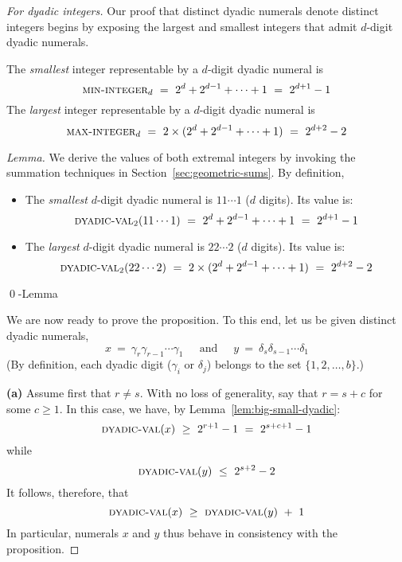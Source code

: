 \begin{proof}[For dyadic integers]
Our proof that distinct dyadic numerals denote distinct integers begins by exposing the largest and smallest integers that admit $d$-digit dyadic numerals.

\begin{lemma}
\label{lem:big-small-dyadic}
The {\em smallest} integer representable by a $d$-digit dyadic numeral is 
\[ \mbox{\sc min-integer}_d \ = \ 2^d + 2^{d-1} + \cdots + 1 \ = \ 2^{d+1} - 1 \]
The {\em largest} integer representable by a $d$-digit dyadic numeral is
\[ \mbox{\sc max-integer}_d \ = \ 2 \times (2^d + 2^{d-1} + \cdots + 1) \ = \ 2^{d+2} - 2 \]
\end{lemma}

\begin{proof}[Lemma]
We derive the values of both extremal integers by invoking the summation techniques in Section~\ref{sec:geometric-sums}.  By definition,
\begin{itemize}
\item
The {\em smallest} $d$-digit dyadic numeral is $11 \cdots 1$ ($d$ digits).  Its value is:
\[ \mbox{\sc dyadic-val}_2(11 \cdots 1)
 \ = \ 2^d + 2^{d-1} + \cdots + 1 \ = \ 2^{d+1} - 1 \]
\item
The {\em largest} $d$-digit dyadic numeral is  $22 \cdots 2$ ($d$ digits).  Its value is:
\[ \mbox{\sc dyadic-val}_2(22 \cdots 2)
\ = \ 2 \times (2^d + 2^{d-1} + \cdots + 1) \ = \ 2^{d+2} - 2 \]
\end{itemize}
\qed-Lemma
\end{proof}

\bigskip

We are now ready to prove the proposition.  To this end, let us be given distinct dyadic numerals,
\[
x \ = \ \gamma_r \gamma_{r-1} \cdots \gamma_1
 \ \ \ \ \ \mbox{ and } \ \ \ \ \
y \ = \ \delta_s \delta_{s-1} \cdots \delta_1
\]
(By definition, each dyadic digit ($\gamma_i$ or $\delta_j$) belongs to the set $\{1, 2, \ldots, b\}$.)

\smallskip

{\bf (a)} Assume first that $r \neq s$.  With no loss of generality, say that $r = s +c$ for some $c \geq 1$.  In this case, we have, by Lemma~\ref{lem:big-small-dyadic}:
\[ \mbox{\sc dyadic-val}(x) \ \geq \ 2^{r+1} - 1 \ = \ 2^{s+c+1} -1 \]
while
\[ \mbox{\sc dyadic-val}(y) \ \leq \ 2^{s+2} - 2 \]
It follows, therefore, that
\[ \mbox{\sc dyadic-val}(x) \ \geq \ \mbox{\sc dyadic-val}(y) \ + \ 1 \]
In particular, numerals $x$ and $y$ thus behave in consistency with the proposition.


\end{proof}
